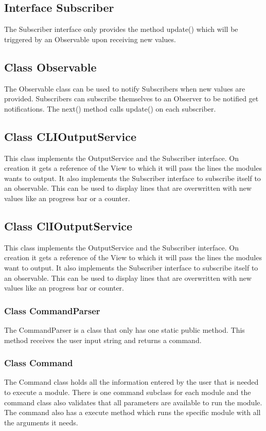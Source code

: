 \documentclass[parskip=full]{scrartcl}
\begin{document}
 \subsection{Interface Subscriber}
The Subscriber interface only provides the method update() which will be triggered by an Observable upon receiving new values.

\subsection{Class Observable} 

The Observable class can be used to notify Subscribers when new values are provided.
Subscribers can subscribe themselves to an Observer to be notified get notifications.
The next() method calls update() on each subscriber.


\subsection{Class CLIOutputService}
This class implements the OutputService and the Subscriber interface. 
On creation it gets a reference of the View to which it will pass the lines the modules wants to output.
It also implements the Subscriber interface to subscribe itself to an observable.
This can be used to display lines that are overwritten with new values like an progress bar or a counter.

\subsection{Class ClIOutputService}
This class implements the OutputService and the Subscriber interface. 
On creation it gets a reference of the View to which it will pass the lines the modules want to output.
It also implements the Subscriber interface to subscribe itself to an observable.
This can be used to display lines that are overwritten with new values like an progress bar or counter.


\subsubsection{Class CommandParser}
The CommandParser is a class that only has one static public method.
This method receives the user input string and returns a command.

\subsubsection{Class Command}
The Command class holds all the information entered by the user that is needed to execute a module.
There is one command subclass for each module and the command class also validates that all parameters are available to run the module.
The command also has a execute method which runs the specific module with all the arguments it needs.
\end{document}
